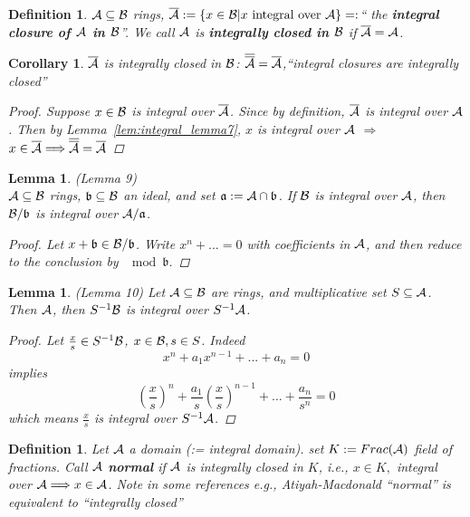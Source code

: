 \documentclass[11pt]{article}
\newtheorem{lemma}[thm]{Lemma}
\newtheorem{cor}[thm]{Corollary}
\newtheorem{dfn}[thm]{Definition}
\newcommand{\sca}{{\mathfrak a}}
\newcommand{\scb}{{\mathfrak b}}
\newcommand{\cala}{{\cal A}}
\newcommand{\calb}{{\cal B}}
\newcommand{\Lrta}{\Longrightarrow}
\begin{document}
\begin{dfn}
$\cala\subseteq \calb$ rings, $\overline{\cala}:=\{x\in\calb|x\text{ integral over }\cala\}=:$`` the \textbf{integral closure of $\cala$ in $\calb$}''. We call $\cala$ is \textbf{integrally closed in $\calb$} if $\overline{\cala}=\cala$.
\end{dfn}

\begin{cor}\label{cor_integral_cor8}
$\overline{\cala}$ is integrally closed in $\calb$: $\overline{\overline{\cala}}=\overline{\cala}$,``integral closures are integrally closed''
\begin{proof}
Suppose $x\in\calb$ is integral over $\overline{\cala}$. Since by definition, $\overline{\cala}$ is  integral over $\cala$. Then by Lemma~\ref{lem:integral_lemma7}, $x$ is integral over $\cala$ $\Lrta$ $x\in \overline{\cala}\Lrta\overline{\overline{\cala}}=\overline{\cala}$
\end{proof}
\end{cor}

\begin{lemma}\label{lem:integral_lemma9}(Lemma 9)\\
$\cala\subseteq \calb$ rings, $\scb\subseteq\calb$ an ideal, and set $\sca:=\cala\cap\scb$. If $\calb$ is integral over $\cala$, then $\calb/\scb$ is integral over $\cala/\sca$.
\begin{proof}
Let $x+\scb\in \calb/\scb$. Write $x^n+...=0$ with coefficients in $\cala$, and then reduce to the conclusion by $\mod \scb$.
\end{proof}
\end{lemma}

\begin{lemma}\label{lem:integral_lemma10}(Lemma 10)
Let $\cala\subseteq \calb$ are rings, and multiplicative set $S\subseteq \cala$. Then $\cala$, then $S^{-1}\calb$ is integral over $S^{-1}\cala$.
\begin{proof}
Let $\frac{x}{s}\in S^{-1}\calb$, $x\in \calb, s\in S$.
Indeed
$$
x^n+a_1 x^{n-1}+...+a_n=0
$$
implies
$$
\left(\frac{x}{s}\right)^n+\frac{a_1}{s}\left(\frac{x}{s}\right)^{n-1}+...+\frac{a_n}{s^n}=0
$$
which means $\frac{x}{s}$ is integral over $S^{-1}\cala$.
\end{proof}
\end{lemma}

\begin{dfn}
Let $\cala$ a domain (:= integral domain).
set $K:=Frac(\cala)$ field of fractions. Call $\cala$ \textbf{normal} if $\cala$ is integrally closed in $K$, i.e., $x\in K, $ integral over $\cala\Lrta x\in\cala$.
Note in some references e.g., Atiyah-Macdonald ``normal'' is equivalent to ``integrally closed''
\end{dfn}
\end{document}

